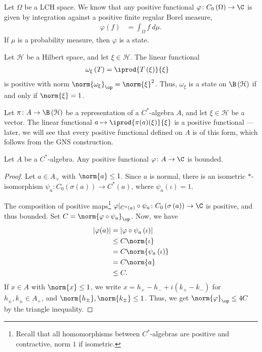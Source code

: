 \documentclass[10pt]{mypackage}
\begin{document}
\begin{example}
  Let $\Omega$ be a LCH space. We know that any positive functional $\varphi\colon C_0\left(\Omega\right)\rightarrow \C$ is given by integration against a positive finite regular Borel measure,
  \begin{align*}
    \varphi\left(f\right) &= \int_{\Omega}^{} f\:d\mu.
  \end{align*}
  If $\mu$ is a probability measure, then $\varphi$ is a state.
\end{example}
\begin{example}
  Let $\mathcal{H}$ be a Hilbert space, and let $\xi\in \mathcal{H}$. The linear functional
  \begin{align*}
    \omega_{\xi}\left(T\right) &= \iprod{T\left(\xi\right)}{\xi}
  \end{align*}
  is positive with norm $\norm{\omega_{\xi}}_{\op} = \norm{\xi}^2$. Thus, $\omega_{\xi}$ is a state on $\B\left(\mathcal{H}\right)$ if and only if $\norm{\xi} = 1$.
\end{example}
\begin{example}
  Let $\pi\colon A\rightarrow \B\left(\mathcal{H}\right)$ be a representation of a $C^{\ast}$-algebra $A$, and let $\xi\in \mathcal{H}$ be a vector. The linear functional $a\mapsto \iprod{\pi(a)(\xi)}{\xi}$ is a positive functional --- later, we will see that every positive functional defined on $A$ is of this form, which follows from the GNS construction.
\end{example}
\begin{proposition}
  Let $A$ be a $C^{\ast}$-algebra. Any positive functional $\varphi\colon A\rightarrow \C$ is bounded.
\end{proposition}
\begin{proof}
  Let $a\in A_{+}$ with $\norm{a}\leq 1$. Since $a$ is normal, there is an isometric $\ast$-isomorphism $\psi_a\colon C_0\left(\sigma\left(a\right)\right)\rightarrow C^{\ast}\left(a\right)$, where $\psi_a\left(\iota\right) = 1$.\newline

  The composition of positive maps\footnote{Recall that all homomorphisms between $C^{\ast}$-algebras are positive and contractive, norm $1$ if isometric.} $\varphi|_{C^{\ast}\left(a\right)}\circ \psi_a\colon C_0\left(\sigma\left(a\right)\right)\rightarrow \C$ is positive, and thus bounded. Set $C = \norm{\varphi\circ \psi_a}_{\op}$. Now, we have
  \begin{align*}
    \left\vert \varphi(a) \right\vert &= \left\vert \varphi\circ \psi_a\left(\iota\right) \right\vert\\
                                      &\leq C\norm{\iota}\\
                                      &= C\norm{\psi_a\left(\iota\right)}\\
                                      &= C\norm{a}\\
                                      &\leq C.
  \end{align*}
  If $x\in A$ with $\norm{x}\leq 1$, we write $x = h_{+} - h_{-} + i\left(k_{+} - k_{-}\right)$ for $h_{\pm},k_{\pm}\in A_{+}$, and $\norm{h_{\pm}},\norm{k_{\pm}}\leq 1$. Thus, we get $\norm{\varphi}_{\op}\leq 4C$ by the triangle inequality.
\end{proof}
\end{document}
